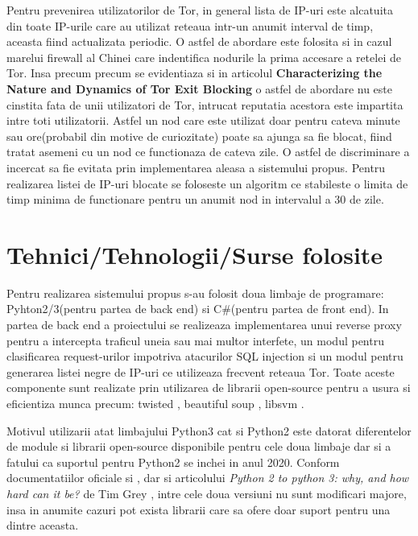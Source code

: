Pentru prevenirea utilizatorilor de Tor, in general lista de IP-uri este alcatuita din toate IP-urile care au utilizat reteaua intr-un anumit interval de timp, aceasta fiind actualizata periodic. O astfel de abordare este folosita si in cazul marelui firewall al Chinei \cite{china_tor} care indentifica nodurile la prima accesare a retelei de Tor. Insa precum precum se evidentiaza si in articolul \textbf{Characterizing the Nature and Dynamics of Tor Exit Blocking} \cite{tor_1} o astfel de abordare nu este cinstita fata de unii utilizatori de Tor, intrucat reputatia acestora este impartita intre toti utilizatorii. Astfel un nod care este utilizat doar pentru cateva minute sau ore(probabil din motive de curiozitate) poate sa ajunga sa fie blocat, fiind tratat asemeni cu un nod ce functionaza de cateva zile. O astfel de discriminare a incercat sa fie evitata prin implementarea aleasa a sistemului propus. Pentru realizarea listei de IP-uri blocate se foloseste un algoritm ce stabileste o limita de timp minima de functionare pentru un anumit nod in intervalul a 30 de zile.


 \section{Tehnici/Tehnologii/Surse folosite}

Pentru realizarea sistemului propus s-au folosit doua limbaje de programare: Pyhton2/3(pentru partea de back end) si C\#(pentru partea de front end). In partea de back end a proiectului se realizeaza implementarea unui reverse proxy pentru a intercepta traficul uneia sau mai multor interfete, un modul pentru clasificarea request-urilor impotriva atacurilor SQL injection si un modul pentru generarea listei negre de IP-uri ce utilizeaza frecvent reteaua Tor. Toate aceste componente sunt realizate prin utilizarea de librarii open-source pentru a usura si eficientiza munca precum: twisted \cite{twisted}, beautiful soup \cite{btf_soup}, libsvm \cite{libsvm}.

Motivul utilizarii atat limbajului Python3 cat si Python2 este datorat diferentelor de module si librarii open-source disponibile pentru cele doua limbaje dar si a fatului ca suportul pentru Python2 se inchei in anul 2020. Conform documentatiilor oficiale \cite{python3_doc} si \cite{python2_doc}, dar si articolului \textit{Python 2 to python 3: why, and how hard can it be?} de Tim Grey \cite{why_python3}, intre cele doua versiuni nu sunt modificari majore, insa in anumite cazuri pot exista librarii care sa ofere doar suport pentru una dintre aceasta.

